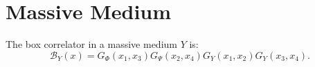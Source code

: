 \chapter{Massive Medium}
The box correlator in a massive medium $Y$ is:
\begin{equation}
	\mathcal{B}_{Y}(x) = G_{\Phi}(x_{1}, x_{3}) G_{\Psi}(x_{2}, x_{4}) G_{Y}(x_{1}, x_{2}) G_{Y}(x_{3}, x_{4}).
\end{equation}
